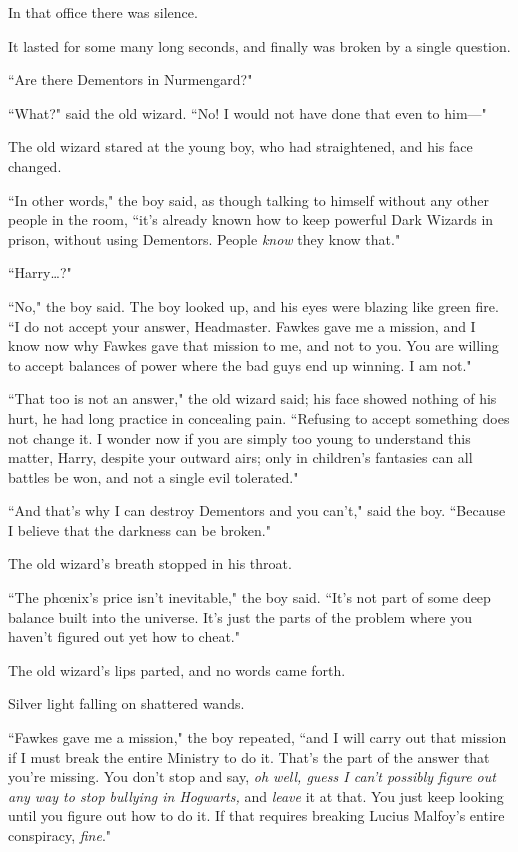 In that office there was silence.

It lasted for some many long seconds, and finally was broken by a single question.

``Are there Dementors in Nurmengard?"

``What?" said the old wizard. ``No! I would not have done that even to him---"

\later

The old wizard stared at the young boy, who had straightened, and his face changed.

``In other words," the boy said, as though talking to himself without any other people in the room, ``it's already known how to keep powerful Dark Wizards in prison, without using Dementors. People \emph{know} they know that."

``Harry{\ldots}?"

``No," the boy said. The boy looked up, and his eyes were blazing like green fire. ``I do not accept your answer, Headmaster. Fawkes gave me a mission, and I know now why Fawkes gave that mission to me, and not to you. You are willing to accept balances of power where the bad guys end up winning. I am not."

``That too is not an answer," the old wizard said; his face showed nothing of his hurt, he had long practice in concealing pain. ``Refusing to accept something does not change it. I wonder now if you are simply too young to understand this matter, Harry, despite your outward airs; only in children's fantasies can all battles be won, and not a single evil tolerated."

``And that's why I can destroy Dementors and you can't," said the boy. ``Because I believe that the darkness can be broken."

The old wizard's breath stopped in his throat.

``The phœnix's price isn't inevitable," the boy said. ``It's not part of some deep balance built into the universe. It's just the parts of the problem where you haven't figured out yet how to cheat."

The old wizard's lips parted, and no words came forth.

Silver light falling on shattered wands.

``Fawkes gave me a mission," the boy repeated, ``and I will carry out that mission if I must break the entire Ministry to do it. That's the part of the answer that you're missing. You don't stop and say, \emph{oh well, guess I can't possibly figure out any way to stop bullying in Hogwarts,} and \emph{leave} it at that. You just keep looking until you figure out how to do it. If that requires breaking Lucius Malfoy's entire conspiracy, \emph{fine}."

